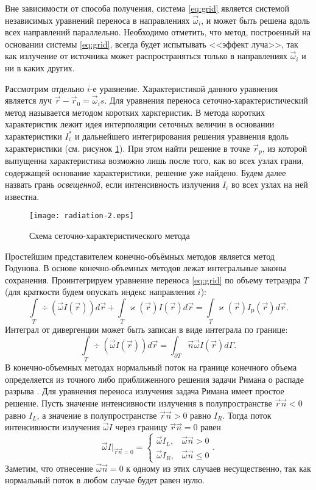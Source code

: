 Вне зависимости от способа получения, система \eqref{eq:grid} является системой независимых уравнений переноса в направлениях $\vec \omega_i$, и может быть решена вдоль всех направлений параллельно. Необходимо отметить, что метод, построенный на основании системы \eqref{eq:grid}, всегда будет испытывать <<эффект луча>>, так как излучение от источника может распространяться только в направлениях $\vec \omega_i$ и ни в каких других.



Рассмотрим отдельно $i$-е уравнение. Характеристикой данного уравнения является луч $\vec r - \vec r_0 = \vec \omega_i s$. 
Для уравнения переноса сеточно-характеристический метод называется методом коротких харктеристик. В метода коротких характеристик лежит идея интерполяции сеточных величин в основании характеристики $I_i^*$ и дальнейшего интегрирования решения уравнения вдоль характеристики (см. рисунок \ref{fig:char}). При этом найти решение в точке $\vec r_p$, из которой выпущенна характеристика возможно лишь после того, как во всех узлах грани, содержащей основание характеристики, решение уже найдено. Будем далее назвать грань \emph{освещенной}, если интенсивность излучения $I_i$ во всех узлах на ней известна.
\begin{figure}[ht!]
\centering
\texttt{[image: radiation-2.eps]}
\caption{Схема сеточно-характеристического метода}
\label{fig:char}
\end{figure}

Простейшим представителем конечно-объёмных методов является метод Годунова. В основе конечно-объемных методов лежат интегральные законы сохранения. Проинтегрируем уравнение переноса
\eqref{eq:grid} по объему тетраэдра $T$ (для краткости будем опускать индекс направления $i$):
\[
\int\limits_T \div (\vec \omega I(\vec r))  d\vec r + \int\limits_T \varkappa(\vec r) I(\vec r)  d\vec r = \int\limits_T \varkappa(\vec r) I_\text{p}(\vec r)  d\vec r.
\]
Интеграл от дивергенции может быть записан в виде интеграла по границе:
\[
\int\limits_T \div (\vec \omega I(\vec r)) d\vec r= \int_{\partial T} \vec n \vec \omega I(\vec r) d\Gamma.
\]
В конечно-объемных методах нормальный поток на границе конечного объема определяется из точного либо приближенного решения задачи Римана о распаде разрыва \cite{Kulikovskiy2001}.
Для уравнения переноса излучения задача Римана имеет простое решение. Пусть значение интенсивности излучения в полупространстве $\vec r \vec n < 0$ равно $I_L$, а значение в полупространстве $\vec r \vec n > 0$ равно $I_R$. Тогда поток интенсивности излучения $\vec \omega I$ через границу $\vec r \vec n = 0$ равен
\[
\vec \omega I\big|_{\vec r \vec n = 0} = 
\begin{cases}
\vec \omega I_L, &\vec \omega \vec n > 0\\
\vec \omega I_R, &\vec \omega \vec n \leq 0
\end{cases}.
\] 
Заметим, что отнесение $\vec \omega \vec n = 0$ к одному из этих случаев несущественно, так как нормальный поток в любом случае будет равен нулю.

